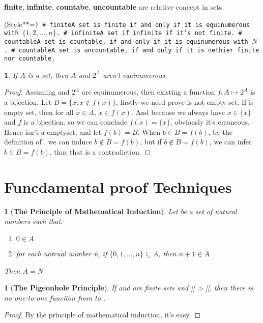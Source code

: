 {\bf finite}, {\bf infinite}, {\bf countabe}, {\bf uncountable} are relative concept in sets.
\begin{easylist}[checklist]
\ListProperties(Style**=\tt)
# finite\quad A set is finite if and only if it is equinumerous with $\{1, 2,\ldots, n\}$.
# infinite\quad A set if infinite if it's not finite.
# countable\quad A set is countable, if and only if it is equinumerous with $N$.
# countable\quad A set is uncountable, if and only if it is nethier finite nor countable.
\end{easylist}

\newtheorem{powersetequinumerous}[theorem_root]{\theorem}
\begin{powersetequinumerous}
If $A$ is a set, then $A$ and $2^A$ aren't equinumerous.
\end{powersetequinumerous}
\begin{proof}
Assuming \ua and $2^A$ are equinumerous, then existing a function $f:A\mapsto 2^A$ is
a bijection. Let $B = \{x: x\notin f(x)\}$, firstly we need prove \ub is not empty set.
If \ub is empty set, then for all $x\in A$, $x\in f(x)$. And because we always have 
$x\in \{x\}$ and $f$ is a bijection, so we can conclude $f(x) = \{x\}$, obviously it's 
erroneous. Hence \ub isn't a emptyset, and let $f(b) = B$. When $b\in B = f(b)$, by the definition of 
\ub, we can induce $b\notin B = f(b)$, but if $b\notin B = f(b)$, we can infer $b\in B = f(b)$, thus 
that is a contradiction.
\end{proof}

\section{Funcdamental proof Techniques}

\newtheorem*{mathinduction}{}
\begin{mathinduction}[\bf The Principle of Mathematical Induction]
Let \ua be a set of natural numbers such that:
\begin{enumerate}
    \item $0\in A$
    \item for each natrual number n, if $\{0, 1,\ldots,n\}\subseteq A$, then
    $n+1\in A$
\end{enumerate}
Then $A = N$
\end{mathinduction}

\newtheorem*{pigeonholeprinciple}{}
\begin{pigeonholeprinciple}[\bf The Pigeonhole Principle]
    If \ua and \ub are finite sets and |\ua| > |\ub|, then there is no one-to-one funciton from \ua to \ub.
\end{pigeonholeprinciple}
\begin{proof}
    By the principle of mathematical induction, it's easy.
\end{proof}

